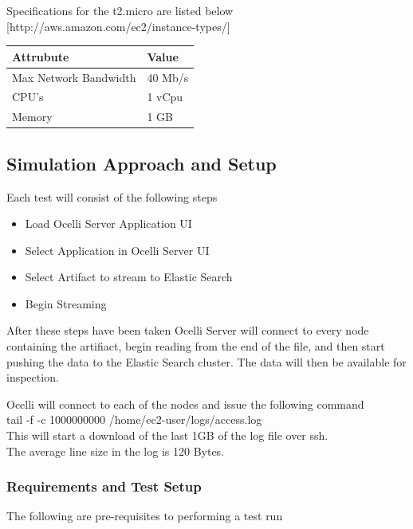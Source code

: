 \documentclass{llncs}
\begin{document}
Specifications for the t2.micro are listed below [http://aws.amazon.com/ec2/instance-types/]

\begin{flushleft}
    \begin{tabular}{ | l | l |}
    \hline
  Attrubute & Value  \\ \hline
Max Network Bandwidth &  40 Mb/s	\\ \hline
CPU's &  1 vCpu	\\ \hline
Memory &  1 GB	\\ 
    \hline
    \end{tabular}
\end{flushleft}

\subsection{Simulation Approach and Setup}

Each test will consist of the following steps

\begin{itemize}
\item Load Ocelli Server Application UI
\item Select Application in Ocelli Server UI
\item Select Artifact to stream to Elastic Search
\item Begin Streaming
\end{itemize}

After these steps have been taken Ocelli Server will connect to every node containing the artifiact, begin reading from the end of the file, and then start pushing the data to the Elastic Search cluster. The data will then be available for inspection.

Ocelli will connect to each of the nodes and issue the following command
\\
tail -f -c 1000000000 /home/ec2-user/logs/access.log
\\
This will start a download of the last 1GB of the log file over ssh. 
\\
The average line size in the log is 120 Bytes.

\subsubsection{Requirements and Test Setup}

The following are pre-requisites to performing a test run
\end{document}
